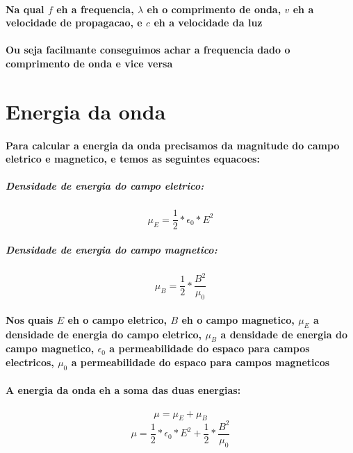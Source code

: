 \documentclass[12pt,twoside, a4paper, twocolumn]{article}
\begin{document}
\paragraph*{Na qual $f$ eh a frequencia, $\lambda$ eh o comprimento de onda, $v$ eh a velocidade de propagacao, e $c$ eh a velocidade da luz}
\paragraph*{Ou seja facilmante conseguimos achar a frequencia dado o comprimento de onda e vice versa}

\section{Energia da onda}
\paragraph*{Para calcular a energia da onda precisamos da magnitude do campo eletrico e magnetico, e temos as seguintes equacoes:}

\subparagraph*{Densidade de energia do campo eletrico:}
\begin{equation}
    \mu_E = \frac{1}{2} * \epsilon_0 * E^2
\end{equation}

\subparagraph*{Densidade de energia do campo magnetico:}
\begin{equation}
    \mu_B = \frac{1}{2} * \frac{B^2}{\mu_0}
\end{equation}

\paragraph{Nos quais $E$ eh o campo eletrico, $B$ eh o campo magnetico, $\mu_E$ a densidade de energia do campo eletrico, $\mu_B$ a densidade de energia do campo magnetico, $\epsilon_0$ a permeabilidade do espaco para campos electricos, $\mu_0$ a permeabilidade do espaco para campos magneticos}
\paragraph{A energia da onda eh a soma das duas energias:}
\begin{equation}
    \mu = \mu_E + \mu_B
\end{equation}
\begin{equation}
    \mu = \frac{1}{2} * \epsilon_0 * E^2 + \frac{1}{2} * \frac{B^2}{\mu_0}
\end{equation}
\end{document}
